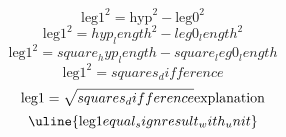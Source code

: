 \[\text{{{leg1}}}^{{2}}=\text{{{hyp}}}^{{2}}-\text{{{leg0}}}^{{2}}\]
\[\text{{{leg1}}}^{{2}}={hyp_length}^{{2}}-{leg0_length}^{{2}}\]
\[\text{{{leg1}}}^{{2}}={square_hyp_length}-{square_leg0_length}\]
\[\text{{{leg1}}}^{{2}}={squares_difference}\]
\[\text{{{leg1}}}=\sqrt{{\mathstrut {squares_difference}}}\text{{{explanation}}}\]
\[\uline{{\text{{{leg1}}}{equal_sign}{result_with_unit}}}\]
